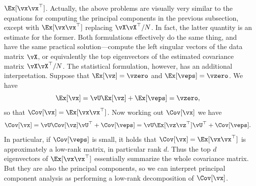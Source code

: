 \documentclass[../../book-main.tex]{subfiles}
\begin{document}
\(\Ex[\vx\vx^{\top}]\). Actually, the above problems are visually
very similar to the equations for computing the principal components
in the previous subsection, except with \(\Ex[\vx\vx^{\top}]\)
replacing \(\vX\vX^{\top}/N\). In fact, the latter quantity is an
estimate for the former. Both formulations effectively do the same
thing, and have the same practical solution---compute the left
singular vectors of the data matrix \(\vX\), or equivalently the top
eigenvectors of the estimated covariance matrix \(\vX\vX^{\top}/N\).
The statistical formulation, however, has an additional
interpretation. Suppose that \(\Ex[\vz] = \vzero\) and \(\Ex[\veps] =
\vzero\). We have
\begin{equation}
    \Ex[\vx] = \vU\Ex[\vz] + \Ex[\veps] = \vzero,
\end{equation}
so that \(\Cov[\vx] = \Ex[\vx\vx^{\top}]\). Now working out
\(\Cov[\vx]\) we have
\begin{equation}
    \Cov[\vx] = \vU\Cov[\vz]\vU^{\top} + \Cov[\veps] =
    \vU\Ex[\vz\vz^{\top}]\vU^{\top} + \Cov[\veps].
\end{equation}
In particular, if \(\Cov[\veps]\) is small, it holds that \(\Cov[\vx]
= \Ex[\vx\vx^{\top}]\) is approximately a low-rank matrix, in
particular rank \(d\). Thus the top \(d\) eigenvectors of
\(\Ex[\vx\vx^{\top}]\) essentially summarize the whole covariance
matrix. But they are also the principal components, so we can
interpret principal component analysis as performing a low-rank
decomposition of \(\Cov[\vx]\).
\end{document}
